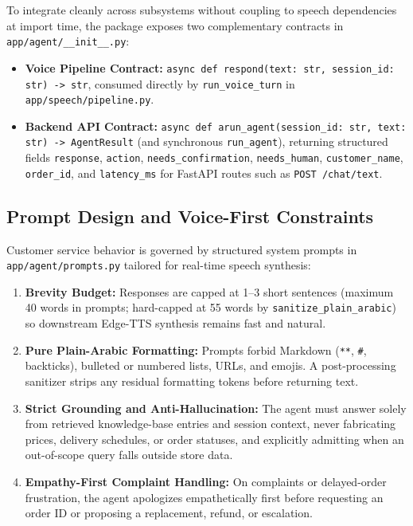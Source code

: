 To integrate cleanly across subsystems without coupling to speech dependencies at import time, the package exposes two complementary contracts in \texttt{app/agent/\_\_init\_\_.py}:
\begin{itemize}
    \item \textbf{Voice Pipeline Contract:} \texttt{async def respond(text: str, session\_id: str) -> str}, consumed directly by \texttt{run\_voice\_turn} in \texttt{app/speech/pipeline.py}.
    \item \textbf{Backend API Contract:} \texttt{async def arun\_agent(session\_id: str, text: str) -> AgentResult} (and synchronous \texttt{run\_agent}), returning structured fields \texttt{response}, \texttt{action}, \texttt{needs\_confirmation}, \texttt{needs\_human}, \texttt{customer\_name}, \texttt{order\_id}, and \texttt{latency\_ms} for FastAPI routes such as \texttt{POST /chat/text}.
\end{itemize}

\subsection{Prompt Design and Voice-First Constraints}
\label{subsec:prompt_design}

Customer service behavior is governed by structured system prompts in \texttt{app/agent/prompts.py} tailored for real-time speech synthesis:
\begin{enumerate}
    \item \textbf{Brevity Budget:} Responses are capped at 1--3 short sentences (maximum 40 words in prompts; hard-capped at 55 words by \texttt{sanitize\_plain\_arabic}) so downstream Edge-TTS synthesis remains fast and natural.
    \item \textbf{Pure Plain-Arabic Formatting:} Prompts forbid Markdown (\texttt{**}, \texttt{\#}, backticks), bulleted or numbered lists, URLs, and emojis. A post-processing sanitizer strips any residual formatting tokens before returning text.
    \item \textbf{Strict Grounding and Anti-Hallucination:} The agent must answer solely from retrieved knowledge-base entries and session context, never fabricating prices, delivery schedules, or order statuses, and explicitly admitting when an out-of-scope query falls outside store data.
    \item \textbf{Empathy-First Complaint Handling:} On complaints or delayed-order frustration, the agent apologizes empathetically first before requesting an order ID or proposing a replacement, refund, or escalation.
\end{enumerate}

